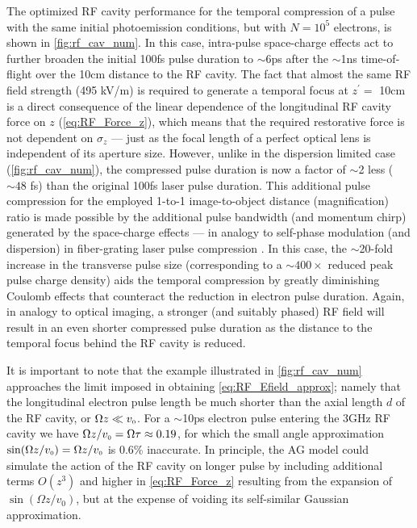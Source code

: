 The optimized RF cavity performance for the temporal compression of a pulse with the same initial photoemission conditions, but with $N = 10^{5}$ electrons, is shown in \ref{fig:rf_cav_num}.
In this case, intra-pulse space-charge effects act to further broaden the initial 100fs pulse duration to $\sim$6ps after the $\sim$1ns time-of-flight over the 10cm distance to the RF cavity.
The fact that almost the same RF field strength (495 kV/m) is required to generate a temporal focus at $z^{\prime} = $ 10cm is a direct consequence of the linear dependence of the longitudinal RF cavity force on $z$ (\ref{eq:RF_Force_z}), which means that the required restorative force is not dependent on $\sigma_{z}$ --- just as the focal length of a perfect optical lens is independent of its aperture size.
However, unlike in the dispersion limited case (\ref{fig:rf_cav_num}), the compressed pulse duration is now a factor of $\sim$2 less ($\sim 48$ fs) than the original 100fs laser pulse duration.
This additional pulse compression for the employed 1-to-1 image-to-object distance (magnification) ratio is made possible by the additional pulse bandwidth (and momentum chirp) generated by the space-charge effects --- in analogy to self-phase modulation (and dispersion) in fiber-grating laser pulse compression \cite{strickland_compression_1985}.
In this case, the $\sim$20-fold increase in the transverse pulse size (corresponding to a $\sim400\times$ reduced peak pulse charge density) aids the temporal compression by greatly diminishing Coulomb effects that counteract the reduction in electron pulse duration.
Again, in analogy to optical imaging, a stronger (and suitably phased) RF field will result in an even shorter compressed pulse duration as the distance to the temporal focus behind the RF cavity is reduced.

It is important to note that the example illustrated in \ref{fig:rf_cav_num} approaches the limit imposed in obtaining \ref{eq:RF_Efield_approx}; namely that the longitudinal electron pulse length be much shorter than the axial length $d$ of the RF cavity, or $ \Omega z \ll v_{{\scriptscriptstyle 0}} $.
For a $\sim$10ps electron pulse entering the 3GHz RF cavity we have $ \Omega z / v_{{\scriptscriptstyle 0}} = \Omega \tau \approx 0.19 $, for which the small angle approximation $ \sin ( \Omega z / v_{{\scriptscriptstyle 0}} ) = \Omega z / v_{{\scriptscriptstyle 0}} $ is 0.6\% inaccurate.
In principle, the AG model could simulate the action of the RF cavity on longer pulse by including additional terms $O( z^{3} )$ and higher in \ref{eq:RF_Force_z} resulting from the expansion of $ \sin \left ( \Omega z / v_{0} \right ) $, but at the expense of voiding its self-similar Gaussian approximation.

